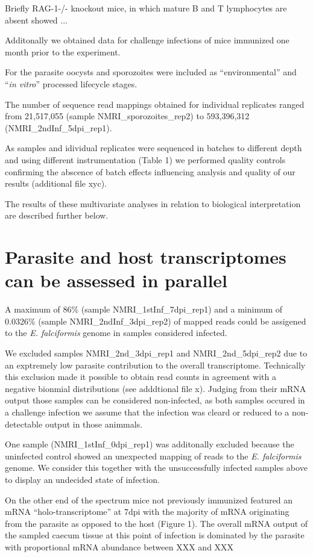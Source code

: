 \documentclass{bmcart}
\begin{document}
Briefly RAG-1-/- knockout mice, in which mature B and T lymphocytes
are absent showed ... 

Additonally we obtained data for challenge infections of mice
immunized one month prior to the experiment.


For the parasite oocysts and sporozoites were included as
``environmental'' and ``\textit{in vitro}'' processed lifecycle
stages.

The number of sequence read mappings obtained for individual
replicates ranged from 21,517,055 (sample NMRI\_sporozoites\_rep2) to
593,396,312 (NMRI\_2ndInf\_5dpi\_rep1).

As samples and idividual replicates were sequenced in batches to
different depth and using different instrumentation (Table 1) we
performed quality controls confirming the abscence of batch effects
influencing analysis and quality of our results (additional file xyc).

The results of these multivariate analyses in relation to biological
interpretation are described further below. 

\section*{Parasite and host transcriptomes can be assessed in parallel}

A maximum of 86\% (sample NMRI\_1stInf\_7dpi\_rep1) and a minimum of
0.0326\% (sample NMRI\_2ndInf\_3dpi\_rep2) of mapped reads could be
assigened to the \textit{E. falciformis} genome in samples considered
infected.

We excluded samples NMRI\_2nd\_3dpi\_rep1 and NMRI\_2nd\_5dpi\_rep2
due to an exptremely low parasite contribution to the overall
transcriptome. Technically this exclusion made it possible to obtain
read counts in agreement with a negative bionmial distributions (see
adddtional file x). Judging from their mRNA output those samples can
be considered non-infected, as both samples occured in a challenge
infection we assume that the infection was cleard or reduced to a
non-detectable output in those animmals.

One sample (NMRI\_1stInf\_0dpi\_rep1) was additonally excluded because
the uninfected control showed an unexpected mapping of reads to the
\textit{E. falciformis} genome. We consider this together with the
unsuccessfully infected samples above to display an undecided state of
infection.

On the other end of the spectrum mice not previously immunized
featured an mRNA ``holo-transcriptome'' at 7dpi with the majority of
mRNA originating from the parasite as opposed to the host (Figure
1). The overall mRNA output of the sampled caecum tissue at this point
of infection is dominated by the parasite with proportional mRNA
abundance between XXX and XXX %
\end{document}
